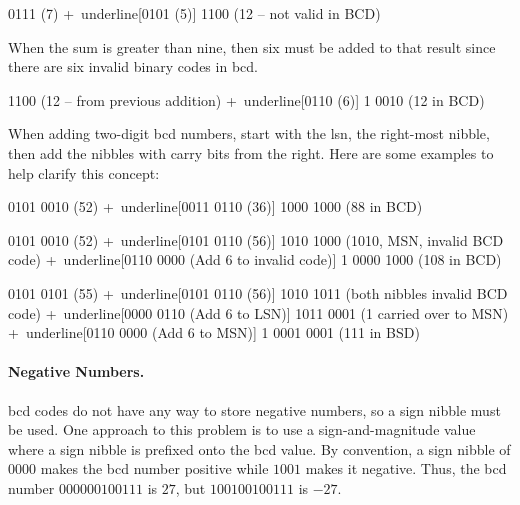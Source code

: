 \begin{binDisp}[commandchars=~\[\]]
     0111  (7)
    +~underline[0101  (5)]
     1100  (12 -- not valid in BCD)
\end{binDisp}

When the sum is greater than nine, then six must be added to that result since there are six invalid binary codes in \gls{bcd}.

\begin{binDisp}[commandchars=~\[\]]
     1100  (12 -- from previous addition)
    +~underline[0110  (6)]
   1 0010  (12 in BCD)
\end{binDisp}

When adding two-digit \gls{bcd} numbers, start with the \gls{lsn}, the right-most nibble, then add the nibbles with carry bits from the right. Here are some examples to help clarify this concept:

\begin{binDisp}[commandchars=~\[\], samepage=true]
     0101 0010  (52)
    +~underline[0011 0110  (36)]
     1000 1000  (88 in BCD)
\end{binDisp}

\begin{binDisp}[commandchars=~\[\], samepage=true]
     0101 0010  (52)
    +~underline[0101 0110  (56)]
     1010 1000  (1010, MSN, invalid BCD code)
    +~underline[0110 0000  (Add 6 to invalid code)]
   1 0000 1000  (108 in BCD)
\end{binDisp}

\begin{binDisp}[commandchars=~\[\], samepage=true]
     0101 0101  (55)
    +~underline[0101 0110  (56)]
     1010 1011  (both nibbles invalid BCD code)
    +~underline[0000 0110  (Add 6 to LSN)]
     1011 0001  (1 carried over to MSN)
    +~underline[0110 0000  (Add 6 to MSN)]
   1 0001 0001  (111 in BSD)
\end{binDisp}

\paragraph{Negative Numbers.} \gls{bcd} codes do not have any way to store negative numbers, so a sign nibble must be used. One approach to this problem is to use a sign-and-magnitude value where a sign nibble is prefixed onto the \gls{bcd} value. By convention, a sign nibble of $ 0000 $ makes the \gls{bcd} number positive while $ 1001 $ makes it negative. Thus, the \gls{bcd} number $ 0000 0010 0111 $ is $ 27 $, but $ 1001 0010 0111 $ is $ -27 $. 

